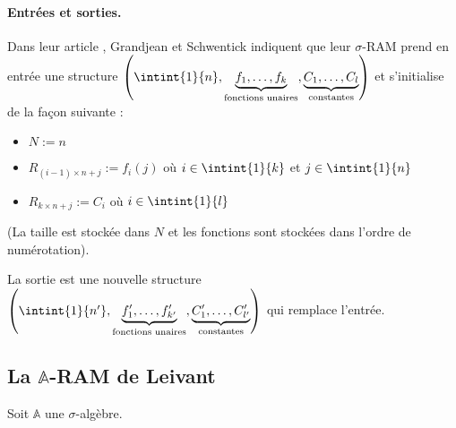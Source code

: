 \documentclass{report}
\newcommand{\bbA}{\mathbb{A}}
\begin{document}
		
			\paragraph{Entrées et sorties.}
			Dans leur article \cite{GrandjeanSchwentick2002}, Grandjean et Schwentick indiquent que leur $\sigma$-RAM prend en entrée une structure $\left( \intint{1}{n}, \underset{\text{fonctions unaires}}{\underbrace{f_1, \dots, f_k}},  \underset{\text{constantes}}{\underbrace{C_1, \dots, C_l}}\right)$ et s'initialise de la façon suivante : 
			
			\begin{itemize}[itemsep=-1mm]
				\item 	$N := n$
				\item 	$R_{(i-1) \times n + j} := f_i(j)$ où $i \in \intint{1}{k}$ et $j \in \intint{1}{n}$
				\item 	$R_{k \times n + j} := C_i$ où $i \in \intint{1}{l}$
			\end{itemize}
			(La taille est stockée dans $N$ et les fonctions sont stockées dans l'ordre de numérotation).
			
			La sortie est une nouvelle structure $\left( \intint{1}{n'}, \underset{\text{fonctions unaires}}{\underbrace{f'_1, \dots, f'_{k'}}},  \underset{\text{constantes}}{\underbrace{C'_1, \dots, C'_{l'}}}\right)$ qui remplace l'entrée.
		
		
		
		\subsection{La $\bbA$-RAM de Leivant}
		\label{subsec:A_RAM_de_Leivant}
		
		Soit $\bbA$ une $\sigma$-algèbre. 
		
\end{document}
